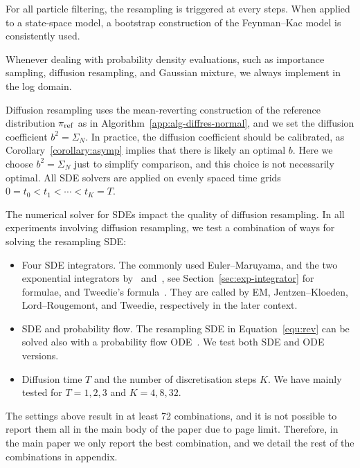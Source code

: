 \documentclass{article}
\begin{document}
For all particle filtering, the resampling is triggered at every steps.
When applied to a state-space model, a bootstrap construction of the Feynman--Kac model is consistently used. 

Whenever dealing with probability density evaluations, such as importance sampling, diffusion resampling, and Gaussian mixture, we always implement in the log domain. 

Diffusion resampling uses the mean-reverting construction of the reference distribution $\pi_{\mathrm{ref}}$ as in Algorithm~\ref{app:alg-diffres-normal}, and we set the diffusion coefficient $b^2 = \Sigma_N$.
In practice, the diffusion coefficient should be calibrated, as Corollary~\ref{corollary:asymp} implies that there is likely an optimal $b$. 
Here we choose $b^2 = \Sigma_N$ just to simplify comparison, and this choice is not necessarily optimal. 
All SDE solvers are applied on evenly spaced time grids $0=t_0 < t_1 < \cdots < t_K=T$. 

The numerical solver for SDEs impact the quality of diffusion resampling. 
In all experiments involving diffusion resampling, we test a combination of ways for solving the resampling SDE:
\begin{itemize}
    \item Four SDE integrators. 
    The commonly used Euler--Maruyama, and the two exponential integrators by~\citet{Jentzen2009} and~\citet{Lord2004}, see Section~\ref{sec:exp-integrator} for formulae, and Tweedie's formula~\citep[][essentially DDPM]{Ho2020}. 
    They are called by EM, Jentzen--Kloeden, Lord--Rougemont, and Tweedie, respectively in the later context.
    \item SDE and probability flow. 
    The resampling SDE in Equation~\ref{equ:rev} can be solved also with a probability flow ODE~\citep{Song2021scorebased}. 
    We test both SDE and ODE versions. 
    \item Diffusion time $T$ and the number of discretisation steps $K$. 
    We have mainly tested for $T = 1, 2, 3$ and $K=4, 8, 32$. 
\end{itemize}

The settings above result in at least 72 combinations, and it is not possible to report them all in the main body of the paper due to page limit. 
Therefore, in the main paper we only report the best combination, and we detail the rest of the combinations in appendix.
\end{document}
